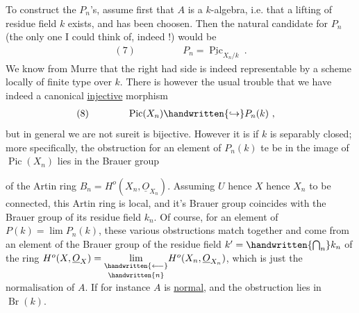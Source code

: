 To construct the $P_n$'s, assume first that $A$ is a $k$-algebra, i.e. that a lifting of  residue field $k$ exists, and has been choosen. Then the natural candidate for $P_n$ (the only one I could think of, indeed !) would be
\[
\begin{aligned}
(7)\qquad\qquad & P_n=\underline{\operatorname{Pic}}_{X_n/k}\ .
\end{aligned}
\]
We know from Murre that the right had side is indeed representable by a scheme locally of finite type over $k$. There is however the usual trouble that we have indeed a canonical \uline{injective} morphism
\[
\begin{aligned}
(8)\qquad\qquad & \operatorname{Pic}(X_n)\handwritten{\hookrightarrow}P_n(k)\ ,
\end{aligned}
\]
but in general we are not sureit is bijective. However it is if $k$ is separably closed; more specifically, the obstruction for an element of $P_n(k)$ te be in the image of $\operatorname{Pic}(X_n)$ lies in the Brauer group  \par\noindent{}

of the Artin ring $B_n=H^o(X_n,\underline{O}_{X_n})$. Assuming $U$ hence $X$ hence $X_n$ to be connected, this Artin ring is local, and it's Brauer group coincides with the Brauer group of its residue field $k_n$. Of course,  for an element of $P(k)=\lim P_n(k)$, these various obstructions match together and come from an element of the Brauer group of the residue field $k'=\handwritten{\bigcap_n}k_n$ of the ring $H^o(X,\underline{O}_X)=\underset{\handwritten{n}}{\underset{\handwritten{\longleftarrow}}{\lim}}H^o(X_n,\underline{O}_{X_n})$,  which is just the normalisation of $A$. If for instance $A$ is \uline{normal},  and the obstruction lies in $\operatorname{Br}(k)$.

